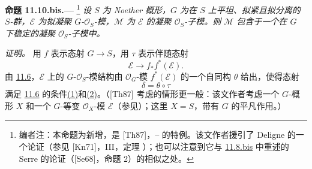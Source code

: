 
\medskip
{}\label{prop:sga3-VIB-11.10.bis}%
\noindent\textbf{命题 11.10.bis.---}%
\footnote{\label{note:sga3-VIB-119}编者注：本命题为新增，是 \textup{[Th87]}，-- 的特例。该文作者援引了 Deligne 的一个论证\textup{（参见 \textup{[Kn71]}，III，定理 ）}；也可以注意到它与 \hyperref[prop:sga3-VIB-11.8-bis]{11.8.bis} 中重述的 Serre 的论证\textup{（\textup{[Se68]}，命题 2）}的相似之处。}
\emph{设 \(S\) 为 Noether 概形，\(G\) 为在 \(S\) 上平坦、拟紧且拟分离的 \(S\)-群，\(\mathcal E\) 为拟凝聚 \(G\)-\(\mathcal O_S\)-模，\(\mathcal M\) 为 \(\mathcal E\) 的凝聚 \(\mathcal O_S\)-子模。则 \(\mathcal M\) 包含于一个在 \(G\) 下稳定的凝聚 \(\mathcal O_S\)-子模中。}

\emph{证明。}
用 \(f\) 表示态射 \(G\to S\)，用 \(\tau\) 表示伴随态射
\[
  \mathcal E\longrightarrow f_*f^*(\mathcal E).
\]
由 \hyperref[par:sga3-VIB-11.6]{11.6}，\(\mathcal E\) 上的 \(G\)-\(\mathcal O_S\)-模结构由 \(\mathcal O_G\)-模 \(f^*(\mathcal E)\) 的一个自同构 \(\theta\) 给出，使得态射
\[
  \delta=\theta\circ\tau
\]
满足 \hyperref[par:sga3-VIB-11.6]{11.6} 的条件\hyperref[diag:sga3-VIB-11.6-1]{\textup{(1)}}和\hyperref[diag:sga3-VIB-11.6-2]{\textup{(2)}}。（\textup{[Th87]} 考虑的情形更一般：该文作者考虑一个 \(G\)-概形 \(X\) 和一个 \(G\)-等变 \(\mathcal O_X\)-模 \(\mathcal E\)\textup{（参见）}；这里 \(X=S\)，带有 \(G\) 的平凡作用。）

